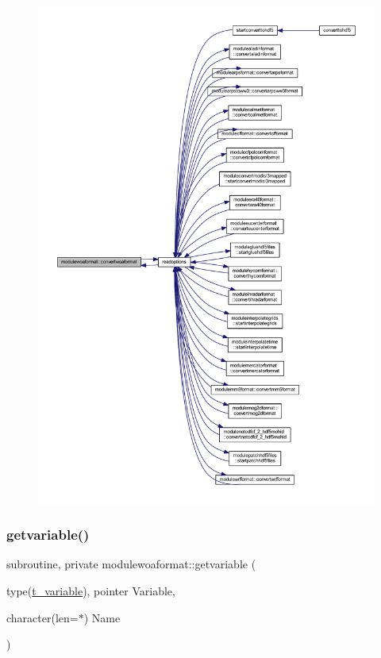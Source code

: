 \begin{figure}[H]
\begin{center}
\leavevmode
\includegraphics[width=350pt]{namespacemodulewoaformat_a78a5f7c9fae1c493a47fc480b6f3dd86_icgraph}
\end{center}
\end{figure}
\mbox{\label{namespacemodulewoaformat_a0dce7fe9b034991dc5845a3e8ecc8cba}} 
\subsubsection{\texorpdfstring{getvariable()}{getvariable()}}
{\footnotesize\ttfamily subroutine, private modulewoaformat\+::getvariable (\begin{DoxyParamCaption}\item[{type(\mbox{\hyperlink{structmodulewoaformat_1_1t__variable}{t\+\_\+variable}}), pointer}]{Variable,  }\item[{character(len=$\ast$)}]{Name }\end{DoxyParamCaption})\hspace{0.3cm}{\ttfamily [private]}}

